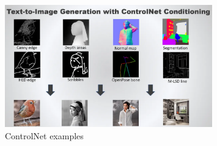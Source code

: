 \documentclass[
  a4paper,  %
  twoside,  %
  bibliography=totoc,
  headsepline,
  cleardoublepage=empty,
  parskip=half,
  draft=false
]{scrbook}
\begin{document}
\begin{figure}[h]
  \centering
  \includegraphics[width=0.8\textwidth]{./graphics/images/diffusion/ControlNet.png}
  \caption{ControlNet examples \cite{foongIntroductionControlNetStable2023}}
  \label{fig:ControlNet}
\end{figure}
\end{document}

